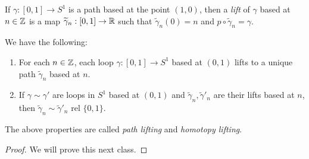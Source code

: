 \begin{definition}
  If $\gamma : [0, 1] \to S^1$ is a path based at
  the point $(1, 0)$, then a
  \emph{lift} of $\gamma$ based at
  $n \in \mathbb{Z}$ is a map $\widetilde{\gamma}_n : [0, 1] \to \mathbb{R}$
  such that $\widetilde{\gamma}_n(0) = n$ and
  $p \circ \widetilde{\gamma}_n = \gamma$.
\end{definition}

\begin{lemma}\label{lem:lifting}
  We have the following:
  \begin{enumerate}
    \item For each $n \in \mathbb{Z}$, each loop
      $\gamma : [0, 1] \to S^1$ based at $(0, 1)$
      lifts to a unique path $\widetilde{\gamma}_n$
      based at $n$.
    \item If $\gamma \sim \gamma'$ are loops in
      $S^1$ based at $(0, 1)$ and
      $\widetilde{\gamma}_n, \widetilde{\gamma}'_n$
      are their lifts based at $n$, then
      $\widetilde{\gamma}_n \sim \widetilde{\gamma}'_n$
      rel $\{0, 1\}$.
  \end{enumerate}
  The above properties are called \emph{path lifting}
  and \emph{homotopy lifting}.
\end{lemma}

\begin{proof}
  We will prove this next class.
\end{proof}

